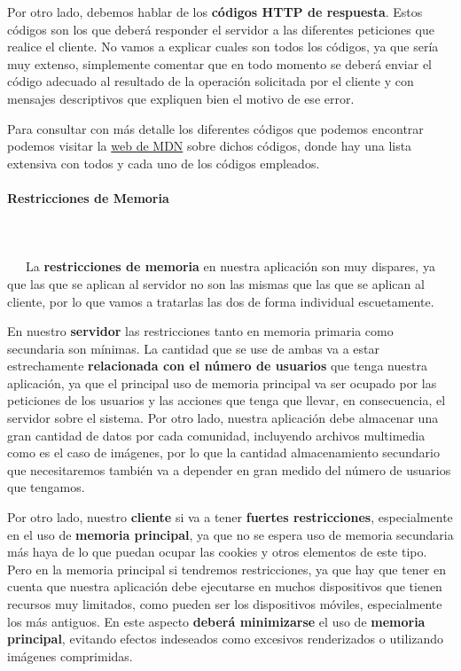 Por otro lado, debemos hablar de los \textbf{códigos HTTP de respuesta}. Estos códigos son los que deberá responder el servidor a las diferentes peticiones que realice el cliente. No vamos a explicar cuales son todos los códigos, ya que sería muy extenso, simplemente comentar que en todo momento se deberá enviar el código adecuado al resultado de la operación solicitada por el cliente y con mensajes descriptivos que expliquen bien el motivo de ese error. 

Para consultar con más detalle los diferentes códigos que podemos encontrar podemos visitar la \href{https://developer.mozilla.org/en-US/docs/Web/HTTP/Status}{web de MDN} sobre dichos códigos, donde hay una lista extensiva con todos y cada uno de los códigos empleados.

\paragraph{Restricciones de Memoria}
~\\\\
\-\ \-\ \-\ La \textbf{restricciones de memoria} en nuestra aplicación son muy dispares, ya que las que se aplican al servidor no son las mismas que las que se aplican al cliente, por lo que vamos a tratarlas las dos de forma individual escuetamente.

En nuestro \textbf{servidor} las restricciones tanto en memoria primaria como secundaria son mínimas. La cantidad que se use de ambas va a estar estrechamente \textbf{relacionada con el número de usuarios} que tenga nuestra aplicación, ya que el principal uso de memoria principal va ser ocupado por las peticiones de los usuarios y las acciones que tenga que llevar, en consecuencia, el servidor sobre el sistema. Por otro lado, nuestra aplicación debe almacenar una gran cantidad de datos por cada comunidad, incluyendo archivos multimedia como es el caso de imágenes, por lo que la cantidad almacenamiento secundario que necesitaremos también va a depender en gran medido del número de usuarios que tengamos.

Por otro lado, nuestro \textbf{cliente} si va a tener \textbf{fuertes restricciones}, especialmente en el uso de\textbf{ memoria principal}, ya que no se espera uso de memoria secundaria más haya de lo que puedan ocupar las cookies y otros elementos de este tipo. Pero en la memoria principal si tendremos restricciones, ya que hay que tener en cuenta que nuestra aplicación debe ejecutarse en muchos dispositivos que tienen recursos muy limitados, como pueden ser los dispositivos móviles, especialmente los más antiguos. En este aspecto \textbf{deberá minimizarse} el uso de \textbf{memoria principal}, evitando efectos indeseados como excesivos renderizados o utilizando imágenes comprimidas.

